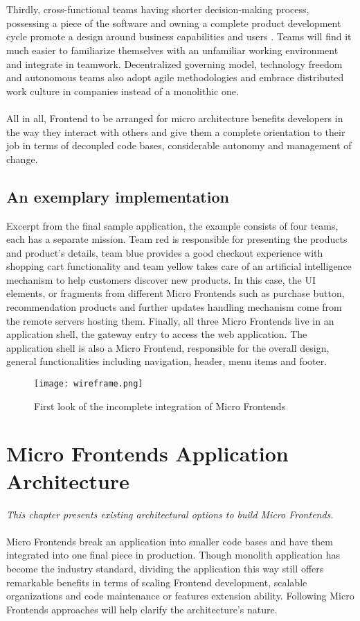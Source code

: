\documentclass[a4paper]{book}
\begin{document}
\\ \\
Thirdly, cross-functional teams having shorter decision-making process, possessing a piece of the software and owning a complete product development cycle promote a design around business capabilities and users . Teams will find it much easier to familiarize themselves with an unfamiliar working environment and integrate in teamwork. Decentralized governing model, technology freedom and autonomous teams also adopt agile methodologies and embrace distributed work culture in companies instead of a monolithic one.
\\ \\
All in all, Frontend to be arranged for micro architecture benefits developers in the way they interact with others and give them a complete orientation to their job in terms of decoupled code bases, considerable autonomy and management of change. 

\section{An exemplary implementation}
Excerpt from the final sample application, the example consists of four teams, each has a separate mission. Team red is responsible for presenting the products and product's details, team blue provides a good checkout experience with shopping cart functionality and team yellow takes care of an artificial intelligence mechanism to help customers discover new products. In this case, the UI elements, or fragments from different Micro Frontends such as purchase button, recommendation products and further updates handling mechanism come from the remote servers hosting them. Finally, all three Micro Frontends live in an application shell, the gateway entry to access the web application. The application shell is also a Micro Frontend, responsible for the overall design, general functionalities including navigation, header, menu items and footer.
\begin{figure}[h!]
    \centering
    \captionsetup{justification=centering}
    \texttt{[image: wireframe.png]}
    \caption{First look of the incomplete integration of Micro Frontends}
    \label{fig:wireframe}
\end{figure}



\chapter{Micro Frontends Application Architecture}
\textit{This chapter presents existing architectural options to build Micro Frontends.}
\\ \\
Micro Frontends break an application into smaller code bases and have them integrated into one final piece in production. Though monolith application has become the industry standard, dividing the application this way still offers remarkable benefits in terms of scaling Frontend development, scalable organizations and code maintenance or features extension ability. Following Micro Frontends approaches will help clarify the architecture’s nature.
\end{document}

